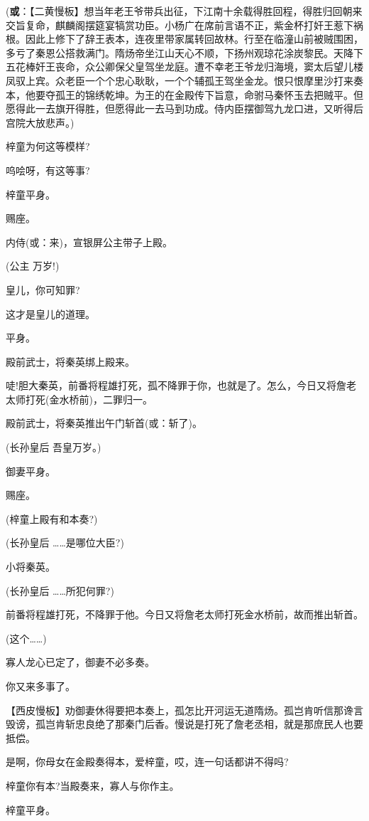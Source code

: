 (\textbf{或}：【二黄慢板】想当年老王爷带兵出征，下江南十余载得胜回程，得胜归回朝来交旨复命，麒麟阁摆筵宴犒赏功臣。小杨广在席前言语不正，紫金杯打奸王惹下祸根。因此上修下了辞王表本，连夜里带家属转回故林。行至在临潼山前被贼围困，多亏了秦恩公搭救满门。隋炀帝坐江山天心不顺，下扬州观琼花涂炭黎民。天降下五花棒奸王丧命，众公卿保父皇驾坐龙庭。遭不幸老王爷龙归海境，窦太后望儿楼凤驭上宾。众老臣一个个忠心耿耿，一个个辅孤王驾坐金龙。恨只恨摩里沙打来奏本，他要夺孤王的锦绣乾坤。为王的在金殿传下旨意，命驸马秦怀玉去把贼平。但愿得此一去旗开得胜，但愿得此一去马到功成。侍内臣摆御驾九龙口进，又听得后宫院大放悲声。)

梓童为何这等模样?

呜哙呀，有这等事?

梓童平身。

赐座。

内侍(或：来)，宣银屏公主带子上殿。

(公主 万岁!)

皇儿，你可知罪?

这才是皇儿的道理。

平身。

殿前武士，将秦英绑上殿来。

唗!胆大秦英，前番将程雄打死，孤不降罪于你，也就是了。怎么，今日又将詹老太师打死(金水桥前)，二罪归一。

殿前武士，将秦英推出午门斩首(或：斩了)。

(长孙皇后 吾皇万岁。)

御妻平身。

赐座。

(梓童上殿有和本奏?)

(长孙皇后 \ldots{}\ldots{}是哪位大臣?)

小将秦英。

(长孙皇后 \ldots{}\ldots{}所犯何罪?)

前番将程雄打死，不降罪于他。今日又将詹老太师打死金水桥前，故而推出斩首。

(这个\ldots{}\ldots{})

寡人龙心已定了，御妻不必多奏。

你又来多事了。

【西皮慢板】劝御妻休得要把本奏上，孤怎比开河运无道隋炀。孤岂肯听信那谗言毁谤，孤岂肯斩忠良绝了那秦门后香。慢说是打死了詹老丞相，就是那庶民人也要抵偿。

是啊，你母女在金殿奏得本，爱梓童，哎，连一句话都讲不得吗?

梓童你有本?当殿奏来，寡人与你作主。

梓童平身。

